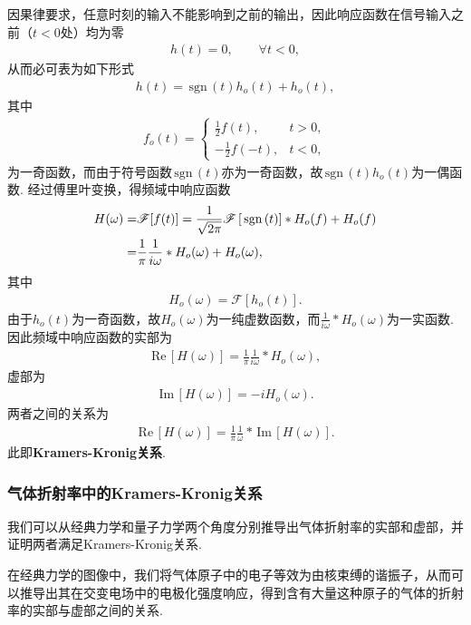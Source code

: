 \documentclass[a4paper, 10pt]{article}
\providecommand{\re}{\,\text{Re}\,} %
\providecommand{\im}{\,\text{Im}\,} %
\providecommand{\sgn}{\,\text{sgn}\,} %
\newcounter{subsubsubsection}[subsubsection]
\begin{document}
\begin{multicols}{2}
因果律要求，任意时刻的输入不能影响到之前的输出，因此响应函数在信号输入之前（$t<0$处）均为零
\begin{align}
    h(t)=0,\qquad\forall t<0,
\end{align}
从而必可表为如下形式
\begin{align}
    h(t)=\sgn(t)h_o(t)+h_o(t),
\end{align}
其中
\begin{align}
    f_o(t)=\left\{\begin{array}{ll}
        \frac{1}{2}f(t),&t>0,\\
        -\frac{1}{2}f(-t),&t<0,
    \end{array}\right.
\end{align}
为一奇函数，而由于符号函数$\sgn(t)$亦为一奇函数，故$\sgn(t)h_o(t)$为一偶函数. 经过傅里叶变换，得频域中响应函数
\begin{align}
    \notag H(\omega)=&\mathscr{F}[f(t)]=\frac{1}{\sqrt{2\pi}}\mathscr{F}\left[\sgn(t)\right]*H_o(f)+H_o(f)\\
    =&\frac{1}{\pi}\frac{1}{i\omega}*H_o(\omega)+H_o(\omega),
\end{align}
其中
\begin{align}
    H_o(\omega)=\mathscr{F}[h_o(t)].
\end{align}
由于$h_o(t)$为一奇函数，故$H_o(\omega)$为一纯虚数函数，而$\frac{1}{i\omega}*H_o(\omega)$为一实函数. 因此频域中响应函数的实部为
\begin{align}
    \re[H(\omega)]=\frac{1}{\pi}\frac{1}{i\omega}*H_o(\omega),
\end{align}
虚部为
\begin{align}
    \im[H(\omega)]=-iH_o(\omega).
\end{align}
两者之间的关系为
\begin{align}
    \boxed{\re[H(\omega)]=\frac{1}{\pi}\frac{1}{\omega}*\im[H(\omega)].}
\end{align}
此即\textbf{Kramers-Kronig关系}.

\subsubsection{气体折射率中的Kramers-Kronig关系}
我们可以从经典力学和量子力学两个角度分别推导出气体折射率的实部和虚部，并证明两者满足Kramers-Kronig关系.

在经典力学的图像中，我们将气体原子中的电子等效为由核束缚的谐振子，从而可以推导出其在交变电场中的电极化强度响应，得到含有大量这种原子的气体的折射率的实部与虚部之间的关系.


\end{multicols}
\end{document}
